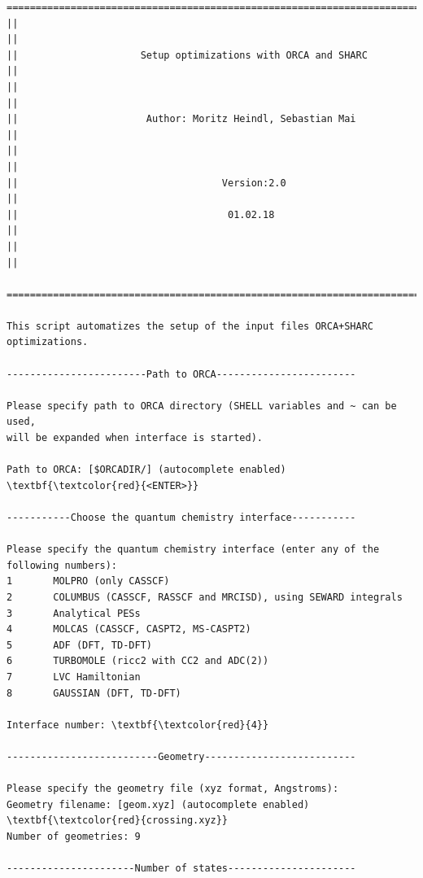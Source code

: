 \documentclass[a4paper,11pt,DIV=15,openany]{scrbook}
\begin{document}
\begin{oframed}
\footnotesize\begin{Verbatim}[commandchars=\\\{\}]
  ================================================================================
||                                                                                ||
||                     Setup optimizations with ORCA and SHARC                    ||
||                                                                                ||
||                      Author: Moritz Heindl, Sebastian Mai                      ||
||                                                                                ||
||                                   Version:2.0                                  ||
||                                    01.02.18                                    ||
||                                                                                ||
  ================================================================================

This script automatizes the setup of the input files ORCA+SHARC optimizations. 
  
------------------------Path to ORCA------------------------

Please specify path to ORCA directory (SHELL variables and ~ can be used, 
will be expanded when interface is started).

Path to ORCA: [$ORCADIR/] (autocomplete enabled) \textbf{\textcolor{red}{<ENTER>}}

-----------Choose the quantum chemistry interface-----------

Please specify the quantum chemistry interface (enter any of the following numbers):
1       MOLPRO (only CASSCF)
2       COLUMBUS (CASSCF, RASSCF and MRCISD), using SEWARD integrals
3       Analytical PESs
4       MOLCAS (CASSCF, CASPT2, MS-CASPT2)
5       ADF (DFT, TD-DFT)
6       TURBOMOLE (ricc2 with CC2 and ADC(2))
7       LVC Hamiltonian
8       GAUSSIAN (DFT, TD-DFT)

Interface number: \textbf{\textcolor{red}{4}}

--------------------------Geometry--------------------------

Please specify the geometry file (xyz format, Angstroms):
Geometry filename: [geom.xyz] (autocomplete enabled) \textbf{\textcolor{red}{crossing.xyz}}
Number of geometries: 9

----------------------Number of states----------------------



\end{Verbatim}
\end{oframed}
\end{document}
